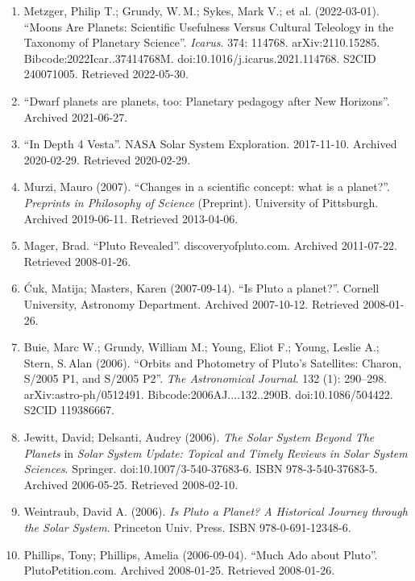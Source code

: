 \begin{enumerate}
\item Metzger, Philip T.; Grundy, W.\,M.; Sykes, Mark V.; et al. (2022-03-01). “Moons Are Planets: Scientific Usefulness Versus Cultural Teleology in the Taxonomy of Planetary Science”. \textit{Icarus}. 374: 114768. arXiv:2110.15285. Bibcode:2022Icar..37414768M. doi:10.1016/j.icarus.2021.114768. S2CID 240071005. Retrieved 2022-05-30.

\item “Dwarf planets are planets, too: Planetary pedagogy after New Horizons”. Archived 2021-06-27.

\item “In Depth \textbar{} 4 Vesta”. NASA Solar System Exploration. 2017-11-10. Archived 2020-02-29. Retrieved 2020-02-29.

\item Murzi, Mauro (2007). “Changes in a scientific concept: what is a planet?”. \textit{Preprints in Philosophy of Science} (Preprint). University of Pittsburgh. Archived 2019-06-11. Retrieved 2013-04-06.

\item Mager, Brad. “Pluto Revealed”. discoveryofpluto.com. Archived 2011-07-22. Retrieved 2008-01-26.

\item Ćuk, Matija; Masters, Karen (2007-09-14). “Is Pluto a planet?”. Cornell University, Astronomy Department. Archived 2007-10-12. Retrieved 2008-01-26.

\item Buie, Marc W.; Grundy, William M.; Young, Eliot F.; Young, Leslie A.; Stern, S.\,Alan (2006). “Orbits and Photometry of Pluto's Satellites: Charon, S/2005 P1, and S/2005 P2”. \textit{The Astronomical Journal}. 132 (1): 290–298. arXiv:astro-ph/0512491. Bibcode:2006AJ....132..290B. doi:10.1086/504422. S2CID 119386667.

\item Jewitt, David; Delsanti, Audrey (2006). \textit{The Solar System Beyond The Planets} in \textit{Solar System Update: Topical and Timely Reviews in Solar System Sciences}. Springer. doi:10.1007/3-540-37683-6. ISBN 978-3-540-37683-5. Archived 2006-05-25. Retrieved 2008-02-10.

\item Weintraub, David A. (2006). \textit{Is Pluto a Planet? A Historical Journey through the Solar System}. Princeton Univ. Press. ISBN 978-0-691-12348-6.

\item Phillips, Tony; Phillips, Amelia (2006-09-04). “Much Ado about Pluto”. PlutoPetition.com. Archived 2008-01-25. Retrieved 2008-01-26.


\end{enumerate}
